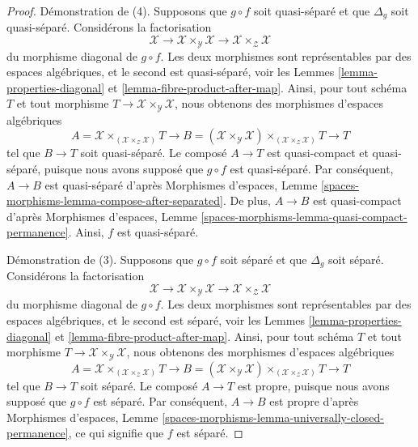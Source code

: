 \begin{proof}
\medskip\noindent
Démonstration de (4). Supposons que $g \circ f$ soit quasi-séparé et que
$\Delta_g$ soit quasi-séparé. Considérons la factorisation
$$
\mathcal{X} \to
\mathcal{X} \times_\mathcal{Y} \mathcal{X} \to
\mathcal{X} \times_\mathcal{Z} \mathcal{X}
$$
du morphisme diagonal de $g \circ f$. Les deux morphismes sont représentables
par des espaces algébriques, et le second est quasi-séparé, voir les Lemmes
\ref{lemma-properties-diagonal} et \ref{lemma-fibre-product-after-map}. Ainsi,
pour tout schéma $T$ et tout morphisme
$T \to \mathcal{X} \times_\mathcal{Y} \mathcal{X}$, nous obtenons des
morphismes d'espaces algébriques
$$
A = \mathcal{X} \times_{(\mathcal{X} \times_\mathcal{Z} \mathcal{X})} T
\longrightarrow
B = (\mathcal{X} \times_\mathcal{Y} \mathcal{X})
\times_{(\mathcal{X} \times_\mathcal{Z} \mathcal{X})} T
\longrightarrow
T
$$
tel que $B \to T$ soit quasi-séparé. Le composé $A \to T$ est quasi-compact
et quasi-séparé, puisque nous avons supposé que $g \circ f$ est quasi-séparé.
Par conséquent, $A \to B$ est quasi-séparé d'après Morphismes d'espaces,
Lemme \ref{spaces-morphisms-lemma-compose-after-separated}. De plus,
$A \to B$ est quasi-compact d'après Morphismes d'espaces, Lemme
\ref{spaces-morphisms-lemma-quasi-compact-permanence}. Ainsi, $f$ est
quasi-séparé.

\medskip\noindent
Démonstration de (3). Supposons que $g \circ f$ soit séparé et que $\Delta_g$
soit séparé. Considérons la factorisation
$$
\mathcal{X} \to
\mathcal{X} \times_\mathcal{Y} \mathcal{X} \to
\mathcal{X} \times_\mathcal{Z} \mathcal{X}
$$
du morphisme diagonal de $g \circ f$. Les deux morphismes sont représentables
par des espaces algébriques, et le second est séparé, voir les Lemmes
\ref{lemma-properties-diagonal} et \ref{lemma-fibre-product-after-map}. Ainsi,
pour tout schéma $T$ et tout morphisme
$T \to \mathcal{X} \times_\mathcal{Y} \mathcal{X}$, nous obtenons des
morphismes d'espaces algébriques
$$
A = \mathcal{X} \times_{(\mathcal{X} \times_\mathcal{Z} \mathcal{X})} T
\longrightarrow
B = (\mathcal{X} \times_\mathcal{Y} \mathcal{X})
\times_{(\mathcal{X} \times_\mathcal{Z} \mathcal{X})} T
\longrightarrow
T
$$
tel que $B \to T$ soit séparé. Le composé $A \to T$ est propre, puisque nous
avons supposé que $g \circ f$ est séparé. Par conséquent, $A \to B$ est propre
d'après Morphismes d'espaces, Lemme
\ref{spaces-morphisms-lemma-universally-closed-permanence}, ce qui signifie
que $f$ est séparé.
\end{proof}

